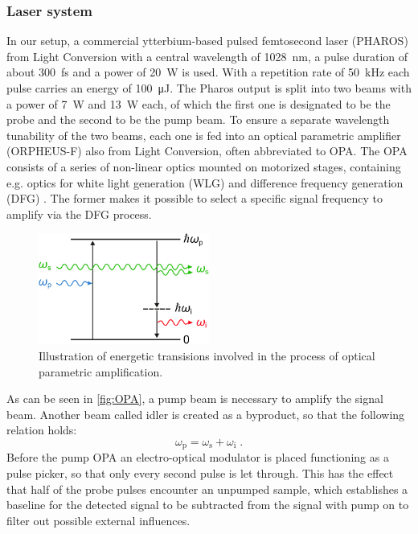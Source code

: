 \subsubsection*{Laser system}
In our setup, a commercial ytterbium-based pulsed femtosecond laser (PHAROS) from Light Conversion with a central wavelength of \qty{1028}{nm}, a pulse duration of about \qty{300}{fs} and a power of \qty{20}{W} is used.
With a repetition rate of \qty{50}{kHz} each pulse carries an energy of \qty{100}{\uJ}.
The Pharos output is split into two beams with a power of \qty{7}{W} and \qty{13}{W} each, of which the first one is designated to be the probe and the second to be the pump beam.
To ensure a separate wavelength tunability of the two beams, each one is fed into an optical parametric amplifier (ORPHEUS-F) also from Light Conversion, often abbreviated to OPA.
The OPA consists of a series of non-linear optics mounted on motorized stages, containing e.g. optics for white light generation (WLG) and difference frequency generation (DFG) \cite{manzoni_design_2016}.
The former makes it possible to select a specific signal frequency to amplify via the DFG process.
\begin{figure}[ht]
    \centering
    \includegraphics[width=0.5\textwidth]{pictures/OPA.pdf}
    \caption{Illustration of energetic transisions involved in the process of optical parametric amplification.}
    \label{fig:OPA}
\end{figure}
As can be seen in \autoref{fig:OPA}, a pump beam is necessary to amplify the signal beam.
Another beam called idler is created as a byproduct, so that the following relation holds:
\begin{equation*}
    \omega_{\text{p}} = \omega_{\text{s}} + \omega_{\text{i}} \;.
\end{equation*}
Before the pump OPA an electro-optical modulator is placed functioning as a pulse picker, so that only every second pulse is let through.
This has the effect that half of the probe pulses encounter an unpumped sample, which establishes a baseline for the detected signal to be subtracted from the signal with pump on to filter out possible external influences.
